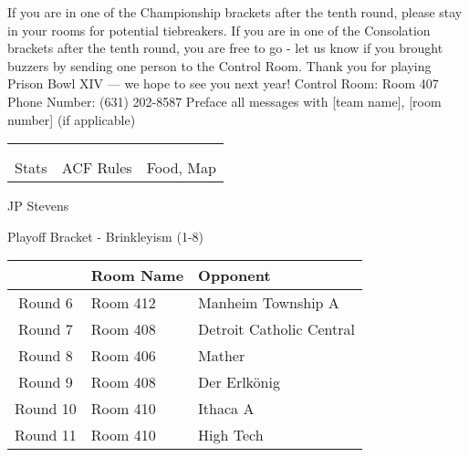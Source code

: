 \documentclass{article}%
\begin{document}
\vspace*{30pt}%
\linebreak%
If you are in one of the Championship brackets after the tenth round, please stay in your rooms for potential tiebreakers.\newline%
\newline%
If you are in one of the Consolation brackets after the tenth round, you are free to go {-} let us know if you brought buzzers by sending one person to the Control Room.\newline%
\newline%
Thank you for playing Prison Bowl XIV — we hope to see you next year!\newline%
\newline%
Control Room: Room 407\newline%
Phone Number: (631) 202{-}8587\newline%
Preface all messages with {[}team name{]}, {[}room number{]} (if applicable)%
\vspace*{30pt}%
\newline%
%
\begin{tabularx}{\textwidth}{YYY}%
  &  &  \\%
\\%
Stats&ACF Rules&Food, Map\\%
\end{tabularx}%
\newpage%
\begin{center}%
\begin{Huge}%
JP Stevens%
\end{Huge}%
\vspace*{12pt}%
\linebreak%
\begin{Large}%
Playoff Bracket {-} Brinkleyism (1{-}8)%
\end{Large}%
\end{center}%
\vspace*{4pt}%
%
\begin{tabularx}{\textwidth}{|c|Y|Y|}%
\hline%
&Room Name&Opponent\\%
\hline%
Round 6&Room 412&Manheim Township A\\%
Round 7&Room 408&Detroit Catholic Central\\%
Round 8&Room 406&Mather\\%
Round 9&Room 408&Der Erlkönig\\%
Round 10&Room 410&Ithaca A\\%
Round 11&Room 410&High Tech\\%
\hline%
\end{tabularx}%
\end{document}
